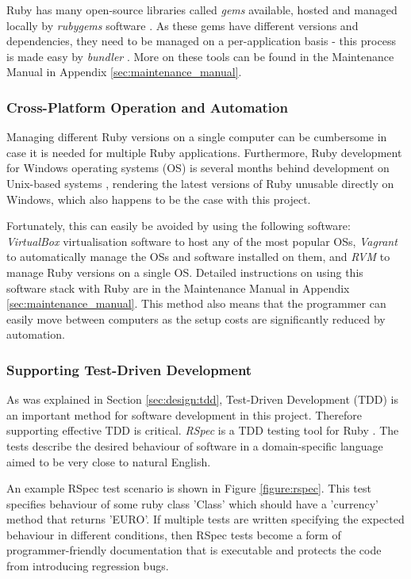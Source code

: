 Ruby has many open-source libraries called \textit{gems} available, hosted and
managed locally by \textit{rubygems} software \parencite{Rubygems}. As these
gems have different versions and dependencies, they need to be managed on a
per-application basis - this process is made easy by \textit{bundler}
\parencite{Bundler}. More on these tools can be found in the Maintenance Manual
in Appendix \ref{sec:maintenance_manual}.

\subsubsection{Cross-Platform Operation and Automation}

Managing different Ruby versions on a single computer can be cumbersome in case
it is needed for multiple Ruby applications. Furthermore, Ruby development for
Windows operating systems (OS) is several months behind development on 
Unix-based systems \parencite{Ruby}, rendering the latest versions of Ruby unusable
directly on Windows, which also happens to be the case with this project.

Fortunately, this can easily be avoided by using the following software:
\textit{VirtualBox} \parencite{Virtualbox} virtualisation software to host any
of the most popular OSs, \textit{Vagrant} \parencite{Vagrant} to automatically
manage the OSs and software installed on them, and \textit{RVM} \parencite{Rvm}
to manage Ruby versions on a single OS. Detailed instructions on using this
software stack with Ruby are in the Maintenance Manual in Appendix
\ref{sec:maintenance_manual}. This method also means that the programmer can
easily move between computers as the setup costs are significantly reduced by
automation.


\subsubsection{Supporting Test-Driven Development}
\label{sec:design:software:tdd}

As was explained in Section \ref{sec:design:tdd}, Test-Driven Development (TDD)
is an important method for software development in this project. Therefore
supporting effective TDD is critical. \textit{RSpec} is a TDD testing tool for
Ruby \parencite{Rspec}. The tests describe the desired behaviour of software in
a domain-specific language aimed to be very close to natural English.

An example RSpec test scenario is shown in Figure \ref{figure:rspec}. This test
specifies behaviour of some ruby class 'Class' which should have a 'currency'
method that returns 'EURO'. If multiple tests are written specifying the
expected behaviour in different conditions, then RSpec tests become a form of
programmer-friendly documentation that is executable and protects the code from
introducing regression bugs.

